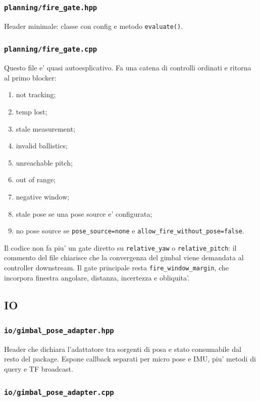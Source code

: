\documentclass[11pt,a4paper]{article}
\newcommand{\code}[1]{\texttt{#1}}
\begin{document}
\subsubsection{\code{planning/fire\_gate.hpp}}

Header minimale: classe con config e metodo \code{evaluate()}.

\subsubsection{\code{planning/fire\_gate.cpp}}

Questo file e' quasi autoesplicativo. Fa una catena di controlli ordinati e ritorna al primo blocker:
\begin{enumerate}[leftmargin=1.4em]
  \item not tracking;
  \item temp lost;
  \item stale measurement;
  \item invalid ballistics;
  \item unreachable pitch;
  \item out of range;
  \item negative window;
  \item stale pose se una pose source e' configurata;
  \item no pose source se \code{pose\_source=none} e \code{allow\_fire\_without\_pose=false}.
\end{enumerate}

Il codice non fa piu' un gate diretto su \code{relative\_yaw} o \code{relative\_pitch}: il commento del file chiarisce che la convergenza del gimbal viene demandata al controller downstream. Il gate principale resta \code{fire\_window\_margin}, che incorpora finestra angolare, distanza, incertezza e obliquita'.

\subsection{IO}

\subsubsection{\code{io/gimbal\_pose\_adapter.hpp}}

Header che dichiara l'adattatore tra sorgenti di posa e stato consumabile dal resto del package. Espone callback separati per micro pose e IMU, piu' metodi di query e TF broadcast.

\subsubsection{\code{io/gimbal\_pose\_adapter.cpp}}
\end{document}
